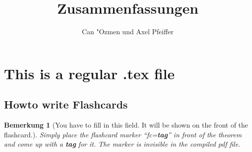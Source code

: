 \documentclass[10pt,a4paper]{article}
\author{Can "Ozmen und Axel Pfeiffer}
\title{Zusammenfassungen}
\newtheorem{bem}[sat]{Bemerkung}
\begin{document}



\section{This is a regular .tex file}
\subsection{Howto write Flashcards}

\begin{bem}[You have to fill in this field. It will be shown on the front of the flashcard.]
 Simply place the flashcard marker ``fc=\textbf{tag}'' in front of the theorem and 
 come up with a \textbf{tag} for it.
 The marker is invisible in the compiled pdf file.
\end{bem}






\printindex
\end{document}
